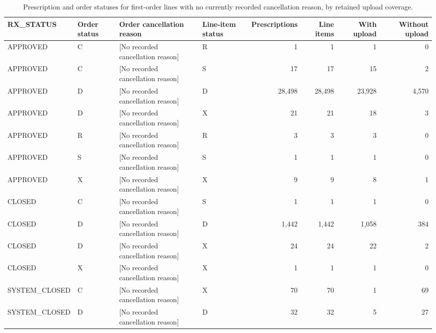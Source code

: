 \begin{table}[htbp]
\centering
\caption{Prescription and order statuses for first-order lines with no currently recorded cancellation reason, by retained upload coverage.}
\label{tab:study-no-cancellation-upload-details}
\small
\setlength{\tabcolsep}{6pt}
\begin{tabular}{llllrrrr}
\toprule
RX\_STATUS & Order status & Order cancellation reason & Line-item status & Prescriptions & Line items & With upload & Without upload \\
\midrule

APPROVED & C & [No recorded cancellation reason] & R & 1 & 1 & 1 & 0 \\

APPROVED & C & [No recorded cancellation reason] & S & 17 & 17 & 15 & 2 \\

APPROVED & D & [No recorded cancellation reason] & D & 28,498 & 28,498 & 23,928 & 4,570 \\

APPROVED & D & [No recorded cancellation reason] & X & 21 & 21 & 18 & 3 \\

APPROVED & R & [No recorded cancellation reason] & R & 3 & 3 & 3 & 0 \\

APPROVED & S & [No recorded cancellation reason] & S & 1 & 1 & 1 & 0 \\

APPROVED & X & [No recorded cancellation reason] & X & 9 & 9 & 8 & 1 \\

CLOSED & C & [No recorded cancellation reason] & S & 1 & 1 & 1 & 0 \\

CLOSED & D & [No recorded cancellation reason] & D & 1,442 & 1,442 & 1,058 & 384 \\

CLOSED & D & [No recorded cancellation reason] & X & 24 & 24 & 22 & 2 \\

CLOSED & X & [No recorded cancellation reason] & X & 1 & 1 & 1 & 0 \\

SYSTEM\_CLOSED & C & [No recorded cancellation reason] & X & 70 & 70 & 1 & 69 \\

SYSTEM\_CLOSED & D & [No recorded cancellation reason] & D & 32 & 32 & 5 & 27 \\


\end{tabular}
\end{table}
